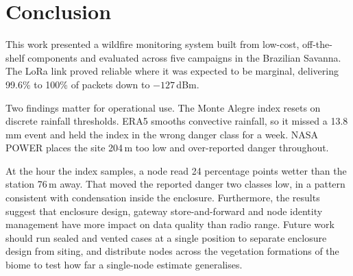 \documentclass[conference]{IEEEtran}
\newenvironment{changed}{}{}
\begin{document}
\section{Conclusion}
\begin{changed}
This work presented a wildfire monitoring system built from low-cost, off-the-shelf components and evaluated across five campaigns in the Brazilian Savanna. The LoRa link proved reliable where it was expected to be marginal, delivering 99.6\% to 100\% of packets down to $-127$\,dBm.

Two findings matter for operational use. The Monte Alegre index resets on discrete rainfall thresholds. ERA5 smooths convective rainfall, so it missed a 13.8\,mm event and held the index in the wrong danger class for a week. NASA POWER places the site 204\,m too low and over-reported danger throughout.

At the hour the index samples, a node read 24 percentage points wetter than the station 76\,m away. That moved the reported danger two classes low, in a pattern consistent with condensation inside the enclosure. Furthermore, the results suggest that enclosure design, gateway store-and-forward and node identity management have more impact on data quality than radio range. Future work should run sealed and vented cases at a single position to separate enclosure design from siting, and distribute nodes across the vegetation formations of the biome \cite{ribeiro_walter_fitofisionomias_1998} to test how far a single-node estimate generalises.
\end{changed}



\end{document}
